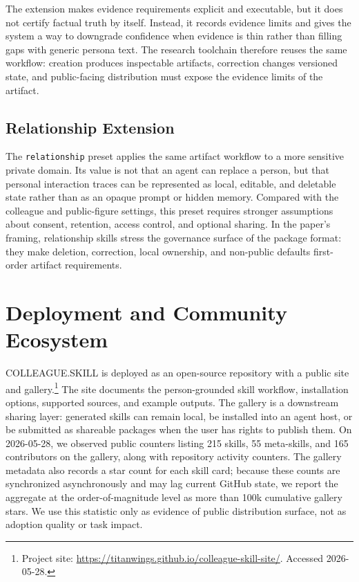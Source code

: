 \documentclass{article}
\newcommand{\system}{\textsc{COLLEAGUE.SKILL}\xspace}
\begin{document}
The extension makes evidence requirements explicit and executable, but it does not certify factual truth by itself. Instead, it records evidence limits and gives the system a way to downgrade confidence when evidence is thin rather than filling gaps with generic persona text. The research toolchain therefore reuses the same workflow: creation produces inspectable artifacts, correction changes versioned state, and public-facing distribution must expose the evidence limits of the artifact.

\subsection{Relationship Extension}

The \texttt{relationship} preset applies the same artifact workflow to a more sensitive private domain. Its value is not that an agent can replace a person, but that personal interaction traces can be represented as local, editable, and deletable state rather than as an opaque prompt or hidden memory. Compared with the colleague and public-figure settings, this preset requires stronger assumptions about consent, retention, access control, and optional sharing. In the paper's framing, relationship skills stress the governance surface of the package format: they make deletion, correction, local ownership, and non-public defaults first-order artifact requirements.

\section{Deployment and Community Ecosystem}

\system is deployed as an open-source repository with a public site and gallery.\footnote{Project site: \url{https://titanwings.github.io/colleague-skill-site/}. Accessed 2026-05-28.} The site documents the person-grounded skill workflow, installation options, supported sources, and example outputs. The gallery is a downstream sharing layer: generated skills can remain local, be installed into an agent host, or be submitted as shareable packages when the user has rights to publish them. On 2026-05-28, we observed public counters listing 215 skills, 55 meta-skills, and 165 contributors on the gallery, along with repository activity counters. The gallery metadata also records a star count for each skill card; because these counts are synchronized asynchronously and may lag current GitHub state, we report the aggregate at the order-of-magnitude level as more than 100k cumulative gallery stars. We use this statistic only as evidence of public distribution surface, not as adoption quality or task impact.
\end{document}
